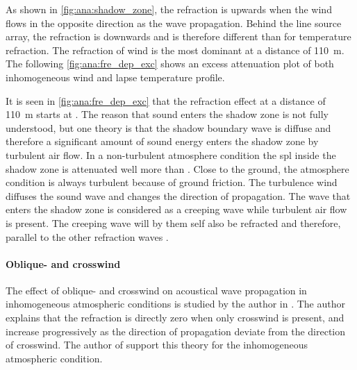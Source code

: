 
As shown in \autoref{fig:ana:shadow_zone}, the refraction is upwards when the wind flows in the opposite direction as the wave propagation. Behind the line source array, the refraction is downwards and is therefore different than for temperature refraction. The refraction of wind is the most dominant at a distance of \SI{110}{\meter}. The following \autoref{fig:ana:fre_dep_exc} shows an excess attenuation plot of both inhomogeneous wind and lapse temperature profile. 


It is seen in \autoref{fig:ana:fre_dep_exc} that the refraction effect at a distance of \SI{110}{\meter} starts at . The reason that sound enters the shadow zone is not fully understood, but one theory is that the shadow boundary wave is diffuse and therefore a significant amount of sound energy enters the shadow zone by turbulent air flow. In a non-turbulent atmosphere condition the \gls{spl} inside the shadow zone is attenuated well more than . Close to the ground, the atmosphere condition is always turbulent because of ground friction. The turbulence wind diffuses the sound wave and changes the direction of propagation. The wave that enters the shadow zone is considered as a creeping wave while turbulent air flow is present. The creeping wave will by them self also be refracted and therefore, parallel to the other refraction waves \citep{tur_on_sound}.




\paragraph{Oblique- and crosswind} The effect of oblique- and crosswind on acoustical wave propagation in inhomogeneous atmospheric conditions is studied by the author in \citep{review_of_sound}. The author explains that the refraction is directly zero when only crosswind is present, and increase progressively as the direction of propagation deviate from the direction of crosswind. The author of \citep{no_refraction_1998} support this theory for the inhomogeneous atmospheric condition.

